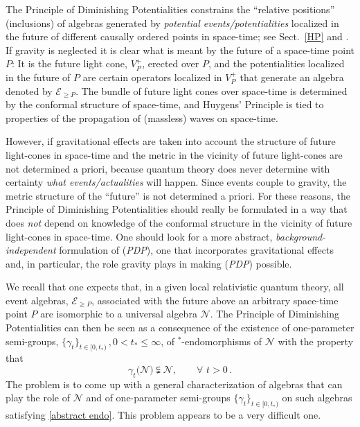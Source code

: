 \documentclass[12pt]{article}
\begin{document}
{The Principle of Diminishing Potentialities constrains the ``relative positions'' (inclusions) of algebras generated by
\textit{potential events/potentialities} localized in the future of different causally ordered points in space-time;
see Sect.~\ref{HP} and \cite{Fr2}. If gravity is neglected it is clear what is meant by the future of a space-time
point $P$: It is the future light cone, $V^{+}_P$, erected over $P$, and the potentialities localized in the future of
$P$ are certain operators localized in $V^{+}_P$ that generate an algebra denoted by $\mathcal{E}_{\geq P}$.
The bundle of future light cones over space-time is determined by the conformal structure of space-time, and
Huygens' Principle is tied to properties of the propagation of (massless) waves on space-time.

However, if gravitational effects are taken into account the structure of future light-cones in space-time and the metric
in the vicinity of future light-cones are not determined a priori, because quantum theory does never determine with certainty
\textit{what events/actualities} will happen. Since events couple to gravity, the metric structure of the ``future'' is
not determined a priori.  For these reasons, the Principle of Diminishing Potentialities should really be formulated in
a way that does \textit{not} depend on knowledge of the conformal structure in the vicinity of future light-cones in space-time.
One should look for a more abstract, \textit{background-independent} formulation of (\textit{PDP}), one that incorporates
gravitational effects and, in particular, the role gravity plays in making (\textit{PDP}) possible.

We recall that one expects that, in a given local relativistic quantum theory, all event algebras,
$\mathcal{E}_{\geq P}$, associated with the future above an arbitrary space-time point $P$ are isomorphic to a
universal algebra $\mathcal{N}$. The Principle of Diminishing Potentialities can then be seen as a consequence of
the existence of one-parameter semi-groups, $\big\{\gamma_t\big\}_{t\in [0, t_{*})}\,, 0< t_{*} \leq \infty$, of
$^{*}$-endomorphisms of $\mathcal{N}$ with the property that
\begin{equation}\label{abstract endo}
\gamma_{t}\big(\mathcal{N}\big) \subsetneqq \mathcal{N}, \qquad \forall\,\,t>0\,.
\end{equation}
The problem is to come up with a general characterization of algebras that can play the role of $\mathcal{N}$
and of one-parameter semi-groups $\big\{\gamma_t\big\}_{t\in [0, t_{*})}$ on such algebras satisfying
\eqref{abstract endo}. This problem appears to be a very difficult one.

}
\end{document}
